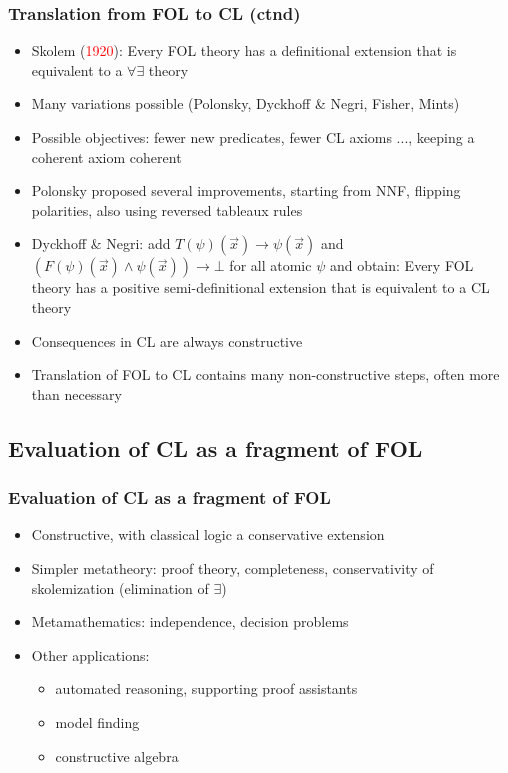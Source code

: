 \documentclass[handout,11pt]{beamer}
\newcommand{\red}[1]{\textcolor{red}{#1}}
\begin{document}
\begin{frame}
\frametitle{Translation from FOL to CL (ctnd)}
 \begin{itemize}[<+->]
   \item Skolem (\red{1920}): Every FOL theory has a definitional 
   extension that is equivalent to a $\forall\exists$ theory
   \item Many variations possible (Polonsky, Dyckhoff \& Negri, Fisher, Mints)
   \item Possible objectives: fewer new predicates, fewer CL axioms ...,
   keeping a coherent axiom coherent
   \item Polonsky proposed several improvements, starting from NNF,
   flipping polarities, also using reversed tableaux rules
   \item Dyckhoff \& Negri: add $T(\psi)(\vec{x}) \to \psi(\vec{x})$ 
   and $(F(\psi)(\vec{x})\wedge \psi(\vec{x})) \to \bot$
   for all atomic $\psi$ and obtain:
   Every FOL theory has a positive semi-definitional extension 
   that is equivalent to a CL theory
   \item Consequences in CL are always constructive
   \item Translation of FOL to CL contains many non-constructive steps,
   often more than necessary
 \end{itemize}
\end{frame}

\subsection{Evaluation of CL as a fragment of FOL}

\begin{frame}
\frametitle{Evaluation of CL as a fragment of FOL}
 \begin{itemize}[<+->]   %
  \item Constructive, with classical logic a conservative extension
  \item Simpler metatheory: proof theory, completeness, 
    conservativity of skolemization (elimination of $\exists$)
  \item Metamathematics: independence, decision problems
  \item Other applications:
   \begin{itemize}[<+->]   %
    \item automated reasoning, supporting proof assistants 
    \item model finding
    \item constructive algebra
   \end{itemize}
 \end{itemize}
\end{frame}
\end{document}
